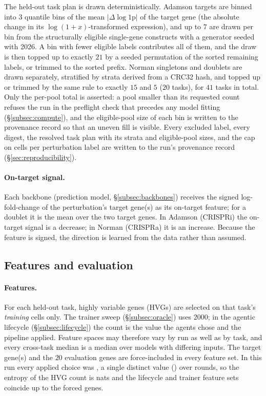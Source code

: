 The held-out task plan is drawn deterministically. Adamson targets are binned into $3$
quantile bins of the mean $|\Delta\log1\mathrm{p}|$ of the target gene (the absolute change
in its $\log(1+x)$-transformed expression), and up to $7$ are
drawn per bin from the structurally eligible single-gene constructs with a generator seeded
with 2026. A bin with fewer eligible labels contributes all of them, and the draw is then
topped up to exactly $21$ by a seeded permutation of the sorted remaining labels, or trimmed
to the sorted prefix. Norman singletons and doublets are drawn separately, stratified by strata
derived from a CRC32 hash, and topped up or trimmed by the same rule to exactly $15$
and $5$ ($20$ tasks), for $41$ tasks in total. Only the per-pool total is asserted: a pool
smaller than its requested count refuses the run in the preflight check that precedes any
model fitting (\S\ref{subsec:compute}), and the eligible-pool size of
each bin is written to the provenance record so that an uneven fill is visible. Every excluded label, every digest, the resolved task plan with
its strata and eligible-pool sizes, and the cap on cells per perturbation label are written
to the run's provenance record (\S\ref{sec:reproducibility}).

\paragraph{On-target signal.} Each backbone (prediction model, \S\ref{subsec:backbones})
receives the signed
log-fold-change of the perturbation's target gene(s) as its on-target
feature; for a doublet it is the mean over the two target genes. In Adamson
(CRISPRi) the on-target signal is a decrease; in Norman (CRISPRa) it is an
increase. Because the feature is signed, the direction
is learned from the data rather than assumed.

\subsection{Features and evaluation}\label{subsec:eval}

\paragraph{Features.} For each held-out task, highly variable genes (HVGs) are selected on
that task's \emph{training} cells only. The trainer sweep (\S\ref{subsec:oracle}) uses
$2000$; in the agentic lifecycle (\S\ref{subsec:lifecycle}) the count is the value the agents
chose and the pipeline applied. Feature spaces may therefore vary by run as well as
by task, and every cross-task median is a median over models with differing inputs. The
target gene(s) and the $20$ evaluation genes are force-included in every feature set. In
this run every applied choice was \resHVGAppliedValue{}, a single distinct value
(\resHVGDistinctApplied) over \resNRoundsTotal{} rounds, so the entropy of the HVG count is
\resHVGEntropy{} nats and the lifecycle and trainer feature sets coincide up to the forced genes.

